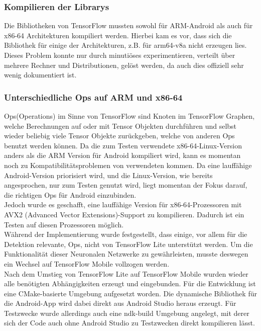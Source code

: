 \documentclass[12pt,a4paper,ngerman,enabledeprecatedfontcommands]{scrreprt}
\begin{document}
\subsubsection{Kompilieren der Librarys}
Die Bibliotheken von TensorFlow mussten sowohl für ARM-Android als auch für x86-64 Architekturen kompiliert werden. Hierbei kam es vor, dass sich die Bibliothek für einige der Architekturen, z.B. für arm64-v8a nicht erzeugen lies. Dieses Problem konnte nur durch minutiöses experimentieren, verteilt über mehrere Rechner und Distributionen, gelöst werden, da auch dies offiziell sehr wenig dokumentiert ist.\\

\subsubsection{Unterschiedliche Ops auf ARM und x86-64}
\glqq{}Ops\grqq (Operations) im Sinne von TensorFlow sind Knoten im TensorFlow Graphen, welche Berechnungen auf oder mit Tensor Objekten durchführen und selbst wieder beliebig viele Tensor Objekte zurückgeben, welche von anderen Ops benutzt werden können.
Da die zum Testen verwendete x86-64-Linux-Version anders als die ARM Version für Android kompiliert wird, kann es momentan noch zu Kompatibilitätsproblemen von verwendeten  kommen.
Da eine lauffähige Android-Version priorisiert wird, und die Linux-Version, wie bereits angesprochen, nur zum Testen genutzt wird, liegt momentan der Fokus darauf, die richtigen Ops für Android einzubinden.\\
Jedoch wurde es geschafft, eine lauffähige Version für x86-64-Prozessoren mit AVX2 (Advanced Vector Extensions)-Support zu kompilieren. Dadurch ist ein Testen auf diesen Prozessoren möglich.\\

Während der Implementierung wurde festgestellt, dass einige, vor allem für die Detektion relevante, Ops, nicht von TensorFlow Lite unterstützt werden. Um die Funktionalität dieser Neuronalen Netzwerke zu gewährleisten, musste deswegen ein Wechsel auf TensorFlow Mobile vollzogen werden.\\
Nach dem Umstieg von TensorFlow Lite auf TensorFlow Mobile wurden wieder alle benötigten Abhängigkeiten erzeugt und eingebunden. Für die Entwicklung ist eine CMake-basierte Umgebung aufgesetzt worden. Die dynamische Bibliothek für die Android-\gls{App} wird dabei direkt aus Android Studio heraus erzeugt. Für Testzwecke wurde allerdings auch eine ndk-build Umgebung angelegt, mit derer sich der Code auch ohne Android Studio zu Testzwecken direkt kompilieren lässt.\\
\end{document}
